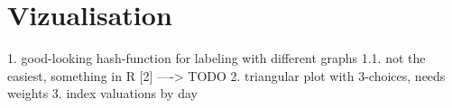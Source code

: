 
\section{Vizualisation}


1. good-looking hash-function for labeling with different graphs
1.1.  not the easiest, something in R [2]
----> TODO
2. triangular plot with 3-choices, needs weights
3. index valuations by day 


